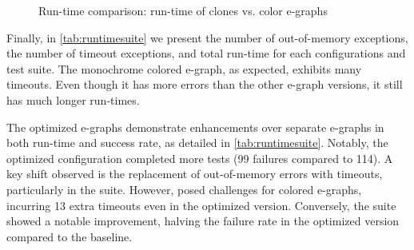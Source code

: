 \begin{figure}
  \centering
  \newcommand\axislab[1]{\fontsize{7pt}{9pt}\selectfont{#1}}
    \vspace{-1em}
    \caption{Run-time comparison: run-time of clones vs. color e-graphs}
    \label{fig:runtime}
\end{figure}

Finally, in \autoref{tab:runtimesuite} we present the number of out-of-memory exceptions, the number of timeout exceptions, and total run-time for each configurations and test suite.
The monochrome colored e-graph, as expected, exhibits many timeouts. 
Even though it has more errors than the other e-graph versions, it still has much longer run-times.

The optimized e-graphs demonstrate enhancements over separate e-graphs in both run-time and success rate, as detailed in \autoref{tab:runtimesuite}. 
Notably, the optimized configuration completed more tests (99 failures compared to 114). 
A key shift observed is the replacement of out-of-memory errors with timeouts, particularly in the  suite. 
However,  posed challenges for colored e-graphs, incurring 13 extra timeouts even in the optimized version. 
Conversely, the  suite showed a notable improvement, halving the failure rate in the optimized version compared to the baseline.


